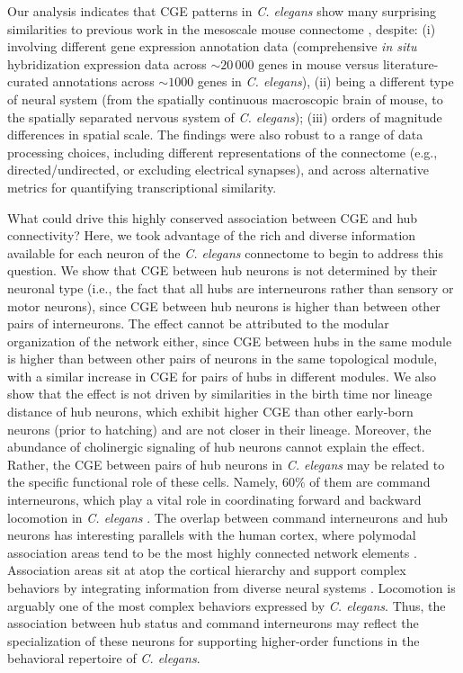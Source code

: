 \documentclass[10pt,letterpaper]{article}
\begin{document}
{Our analysis indicates that CGE patterns in \emph{C. elegans} show many surprising similarities to previous work in the mesoscale mouse connectome \cite{Fulcher:2016ck}, despite:
(i) involving different gene expression annotation data (comprehensive \emph{in situ} hybridization expression data across $\sim20\,000$ genes in mouse versus literature-curated annotations across $\sim 1000$ genes in \emph{C. elegans}),
(ii) being a different type of neural system (from the spatially continuous macroscopic brain of mouse, to the spatially separated nervous system of \emph{C. elegans});
(iii) orders of magnitude differences in spatial scale.
The findings were also robust to a range of data processing choices, including different representations of the connectome (e.g., directed/undirected, or excluding electrical synapses), and across alternative metrics for quantifying transcriptional similarity.

What could drive this highly conserved association between CGE and hub connectivity?
Here, we took advantage of the rich and diverse information available for each neuron of the \emph{C. elegans} connectome to begin to address this question.
We show that CGE between hub neurons is not determined by their neuronal type (i.e., the fact that all hubs are interneurons rather than sensory or motor neurons), since CGE between hub neurons is higher than between other pairs of interneurons.
The effect cannot be attributed to the modular organization of the network either, since CGE between hubs in the same module is higher than between other pairs of neurons in the same topological module, with a similar increase in CGE for pairs of hubs in different modules.
We also show that the effect is not driven by similarities in the birth time nor lineage distance of hub neurons, which exhibit higher CGE than other early-born neurons (prior to hatching) and are not closer in their lineage.
Moreover, the abundance of cholinergic signaling of hub neurons cannot explain the effect.
Rather, the CGE between pairs of hub neurons in \textit{C. elegans} may be related to the specific functional role of these cells.
Namely, 60\% of them are command interneurons, which play a vital role in coordinating forward and backward locomotion in \textit{C. elegans} \cite{Kim:2016gl}.
The overlap between command interneurons and hub neurons has interesting parallels with the human cortex, where polymodal association areas tend to be the most highly connected network elements \cite{vandenHeuvel:2016eg}.
Association areas sit at atop the cortical hierarchy and support complex behaviors by integrating information from diverse neural systems \cite{Mesulam1998}.
Locomotion is arguably one of the most complex behaviors expressed by \emph{C. elegans}.
Thus, the association between hub status and command interneurons may reflect the specialization of these neurons for supporting higher-order functions in the behavioral repertoire of \emph{C. elegans}.

}
\end{document}
